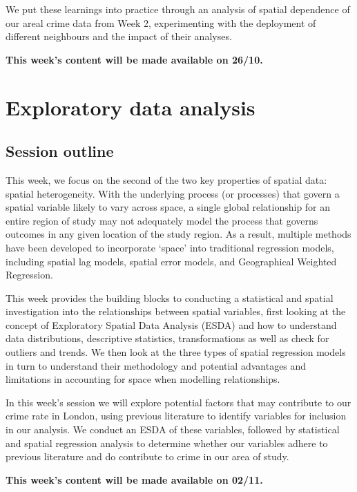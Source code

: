 \documentclass[
]{book}
\begin{document}
We put these learnings into practice through an analysis of spatial dependence of our areal crime data from Week 2, experimenting with the deployment of different neighbours and the impact of their analyses.

\textbf{This week's content will be made available on 26/10.}

\hypertarget{exploratory-data-analysis}{%
\chapter{Exploratory data analysis}\label{exploratory-data-analysis}}

\hypertarget{session-outline}{%
\section{Session outline}\label{session-outline}}

This week, we focus on the second of the two key properties of spatial data: spatial heterogeneity. With the underlying process (or processes) that govern a spatial variable likely to vary across space, a single global relationship for an entire region of study may not adequately model the process that governs outcomes in any given location of the study region. As a result, multiple methods have been developed to incorporate `space' into traditional regression models, including spatial lag models, spatial error models, and Geographical Weighted Regression.

This week provides the building blocks to conducting a statistical and spatial investigation into the relationships between spatial variables, first looking at the concept of Exploratory Spatial Data Analysis (ESDA) and how to understand data distributions, descriptive statistics, transformations as well as check for outliers and trends. We then look at the three types of spatial regression models in turn to understand their methodology and potential advantages and limitations in accounting for space when modelling relationships.

In this week's session we will explore potential factors that may contribute to our crime rate in London, using previous literature to identify variables for inclusion in our analysis. We conduct an ESDA of these variables, followed by statistical and spatial regression analysis to determine whether our variables adhere to previous literature and do contribute to crime in our area of study.

\textbf{This week's content will be made available on 02/11.}
\end{document}
